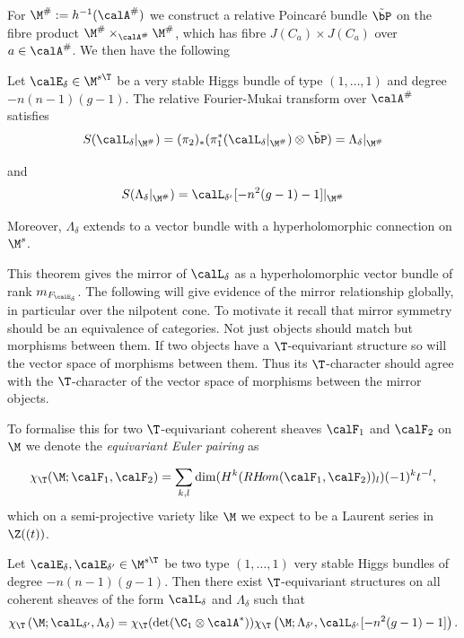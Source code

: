 For $\M^\#:=h^{-1}(\calA^\#)$ we  construct a relative Poincar\'e bundle $\tilde{\bP}$ on the fibre product $\M^\#\times_{\calA^\#}\M^\#$, which has fibre $J(C_a)\times J(C_a)$ over $a\in \calA^\#$.
We then have the following
\begin{theorem}
\notready \label{mainmirror} Let $\calE_\delta\in \M^{s\T}$ be a very stable Higgs bundle of type $(1,\dots,1)$ and degree $-n(n-1)(g-1)$.  The relative Fourier-Mukai transform over $\calA^\#$ satisfies $$S(\calL_\delta|_{\M^\#})=(\pi_2)_*(\pi_1^*(\calL_\delta|_{\M^\#})\otimes \tilde{\bP})= \Lambda_\delta|_{\M^\#}$$

	and 	$$S(\Lambda_\delta|_{\M^\#})=\calL_{\delta^\iota}[-n^2(g-1)-1]|_{\M^\#}$$

	Moreover,   $\Lambda_\delta$ extends to  a  vector bundle with a hyperholomorphic connection on $\M^s$.
\end{theorem}

This theorem gives the mirror of $\calL_\delta$  as a hyperholomorphic vector bundle of rank $m_{F_{\calE_\delta}}$. The following will give evidence of the mirror relationship globally, in particular over the nilpotent cone.  To motivate it recall that mirror symmetry should be an equivalence of categories. Not just objects should match but morphisms between them. If two objects have a $\T$-equivariant structure so will the vector space of morphisms between them. Thus its $\T$-character should agree with the $\T$-character of the vector space of morphisms between the mirror objects.

To formalise this for two $\T$-equivariant coherent sheaves $\calF_1$ and $\calF_2$ on $\M$  we denote the {\em equivariant Euler pairing} as

$$\chi_\T(\M;\calF_1,\calF_2)=\sum_{k,l} \dim(H^k({ R} {H\!om}(\calF_1,\calF_2))_l) (-1)^k t^{-l},$$ which
on a semi-projective variety like $\M$ we expect to be a Laurent series in $\Z((t))$.

\begin{theorem}
\notready \label{maineuler}  Let $\calE_\delta,\calE_{\delta^\prime}\in \M^{s\T}$ be two type $(1,\dots,1)$ very stable Higgs bundles of degree $-n(n-1)(g-1)$. Then there exist $\T$-equivariant structures on all coherent  sheaves of the form $\calL_\delta$ and $\Lambda_\delta$  such that $$\chi_\T\left(\M;\calL_{\delta^\prime},\Lambda_{\delta}\right)=\chi_\T(\det(\C_{1}\otimes\calA^*)) \chi_\T\left(\M;\Lambda_{\delta^\prime},\calL_{\delta^\iota}[-n^2(g-1)-1]
	\right). $$

\end{theorem}

